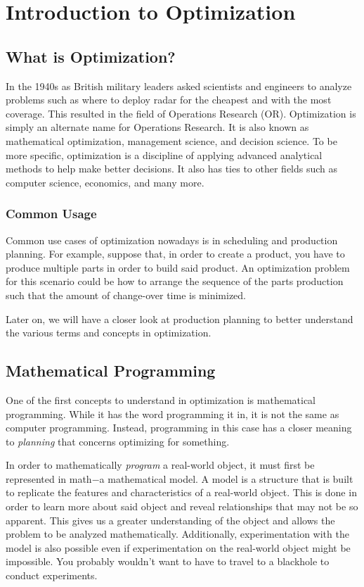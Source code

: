 \chapter{Introduction to Optimization}

\section{What is Optimization?}

In the 1940s as British military leaders asked scientists and engineers to
analyze problems such as where to deploy radar for the cheapest and with the
most coverage. This resulted in the field of Operations Research (OR). 
Optimization is simply an alternate name for Operations Research. It is also
known as mathematical optimization, management science, and decision science.
To be more specific, optimization is a discipline of applying advanced analytical
methods to help make better decisions. It also has ties to other fields such as 
computer science, economics, and many more.

\subsection*{Common Usage}

Common use cases of optimization nowadays is in scheduling and production planning.
For example, suppose that, in order to create a product, you have to produce 
multiple parts in order to build said product. An optimization problem for this
scenario could be how to arrange the sequence of the parts production such that
the amount of change-over time is minimized.

Later on, we will have a closer look at production planning to better
understand the various terms and concepts in optimization.

\section{Mathematical Programming}

One of the first concepts to understand in optimization is mathematical
programming. While it has the word programming it in, it is not the same as 
computer programming. Instead, programming in this case has a closer meaning
to \textit{planning} that concerns optimizing for something.

In order to mathematically \textit{program} a real-world object, it must first be
represented in math$-$a mathematical model. A model is a
structure that is built to replicate the features and characteristics of a
real-world object. This is done in order to learn more about said object and
reveal relationships that may not be so apparent. This gives us a greater
understanding of the object and allows the problem to be analyzed mathematically.
Additionally, experimentation with the model is also possible even if
experimentation on the real-world object might be impossible. You probably
wouldn't want to have to travel to a blackhole to conduct experiments.

